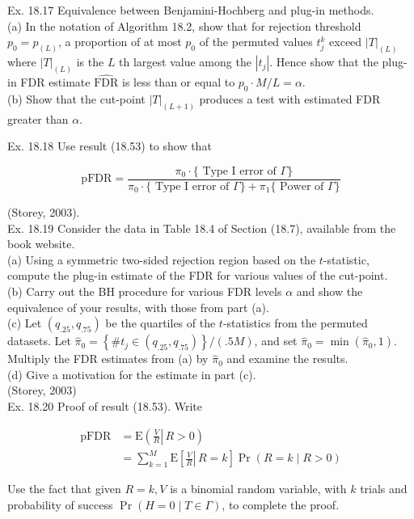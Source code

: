 \documentclass[10pt]{article}
\begin{document}
Ex. 18.17 Equivalence between Benjamini-Hochberg and plug-in methods.\\
(a) In the notation of Algorithm 18.2, show that for rejection threshold $p_{0}=p_{(L)}$, a proportion of at most $p_{0}$ of the permuted values $t_{j}^{k}$ exceed $|T|_{(L)}$ where $|T|_{(L)}$ is the $L$ th largest value among the $\left|t_{j}\right|$. Hence show that the plug-in FDR estimate $\widehat{\mathrm{FDR}}$ is less than or equal to $p_{0} \cdot M / L=\alpha$.\\
(b) Show that the cut-point $|T|_{(L+1)}$ produces a test with estimated FDR greater than $\alpha$.

Ex. 18.18 Use result (18.53) to show that


\begin{equation*}
\mathrm{pFDR}=\frac{\pi_{0} \cdot\{\text { Type I error of } \Gamma\}}{\pi_{0} \cdot\{\text { Type I error of } \Gamma\}+\pi_{1}\{\text { Power of } \Gamma\}} \tag{18.59}
\end{equation*}


(Storey, 2003).\\
Ex. 18.19 Consider the data in Table 18.4 of Section (18.7), available from the book website.\\
(a) Using a symmetric two-sided rejection region based on the $t$-statistic, compute the plug-in estimate of the FDR for various values of the cut-point.\\
(b) Carry out the BH procedure for various FDR levels $\alpha$ and show the equivalence of your results, with those from part (a).\\
(c) Let $\left(q_{.25}, q_{.75}\right)$ be the quartiles of the $t$-statistics from the permuted datasets. Let $\hat{\pi}_{0}=\left\{\# t_{j} \in\left(q_{.25}, q_{.75}\right)\right\} /(.5 M)$, and set $\hat{\pi}_{0}=\min \left(\hat{\pi}_{0}, 1\right)$. Multiply the FDR estimates from (a) by $\hat{\pi}_{0}$ and examine the results.\\
(d) Give a motivation for the estimate in part (c).\\
(Storey, 2003)\\
Ex. 18.20 Proof of result (18.53). Write


\begin{align*}
\mathrm{pFDR} & =\mathrm{E}\left(\left.\frac{V}{R} \right\rvert\, R>0\right)  \tag{18.60}\\
& =\sum_{k=1}^{M} \mathrm{E}\left[\left.\frac{V}{R} \right\rvert\, R=k\right] \operatorname{Pr}(R=k \mid R>0) \tag{18.61}
\end{align*}


Use the fact that given $R=k, V$ is a binomial random variable, with $k$ trials and probability of success $\operatorname{Pr}(H=0 \mid T \in \Gamma)$, to complete the proof.
\end{document}
